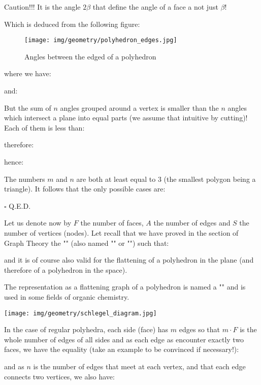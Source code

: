 {\begin{dem}
	Caution!!! It is the angle $2\beta$ that define the angle of a face a not just $\beta$!
	
	Which is deduced from the following figure:
	\begin{figure}[H]
		\centering
		\texttt{[image: img/geometry/polyhedron\_edges.jpg]}
		\caption{Angles between the edged of a polyhedron}
	\end{figure}
	where we have:
	
	and:
	
	But the sum of $n$ angles grouped around a vertex is smaller than the $n$ angles which intersect a plane into equal parts (we assume that intuitive by cutting)! Each of them is less than:
	
	therefore:
	
	hence:
	
	The numbers $m$ and $n$ are both at least equal to $3$ (the smallest polygon being a triangle). It follows that the only possible cases are:
		
	\begin{flushright}
		$\square$  Q.E.D.
	\end{flushright}
	\end{dem}

	Let us denote now by $F$ the number of faces, $A$ the number of edges and $S$ the number of vertices (nodes). Let recall that we have proved in the section of Graph Theory the "" (also named "" or "") such that:	
	
	and it is of course also valid for the flattening of a polyhedron in the plane (and therefore of a polyhedron in the space).
	\begin{tcolorbox}[title=Remark,colframe=black,arc=10pt]
	The representation as a flattening graph of a polyhedron is named a "" and is used in some fields of organic chemistry.
	\begin{center}
		\texttt{[image: img/geometry/schlegel\_diagram.jpg]}
	\end{center}
	\end{tcolorbox}	
	In the case of regular polyhedra, each side (face) has $m$ edges so that $m\cdot F$ is the whole number of edges of all sides and as each edge as encounter exactly two faces, we have the equality (take an example to be convinced if necessary!):
	
	and as $n$ is the number of edges that meet at each vertex, and that each edge connects two vertices, we also have:
	
}

